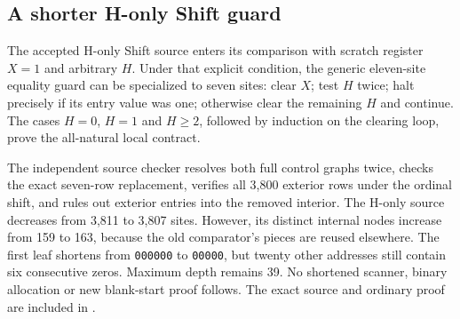 \subsection{A shorter H-only Shift guard}

The accepted H-only Shift source enters its comparison with scratch
register $X=1$ and arbitrary $H$. Under that explicit condition, the generic
eleven-site equality guard can be specialized to seven sites: clear $X$;
test $H$ twice; halt precisely if its entry value was one; otherwise clear
the remaining $H$ and continue. The cases $H=0$, $H=1$ and $H\geq2$, followed
by induction on the clearing loop, prove the all-natural local contract.

The independent source checker resolves both full control graphs twice,
checks the exact seven-row replacement, verifies all 3,800 exterior rows
under the ordinal shift, and rules out exterior entries into the removed
interior. The H-only source decreases from 3,811 to 3,807 sites. However,
its distinct internal nodes increase from 159 to 163, because the old
comparator's pieces are reused elsewhere. The first leaf shortens from
\texttt{000000} to \texttt{00000}, but twenty other addresses still contain
six consecutive zeros. Maximum depth remains 39. No shortened scanner,
binary allocation or new blank-start proof follows. The exact source and
ordinary proof are included in .
